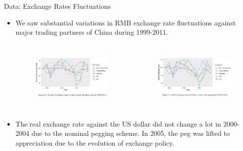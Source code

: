 \documentclass[10pt]{beamer}
\begin{document}
\begin{frame}{Data: Exchange Rates Fluctuations}
	\begin{itemize}
		\item We saw substantial variations in RMB exchange rate fluctuations against major trading partners of China during 1999-2011.
		\begin{columns}
			\begin{figure}[htbp]
				\centering
				\includegraphics[width=1.1\columnwidth]{Figure3.1.jpg}
				\label{fig3.1}
			\end{figure}
			\begin{figure}[htbp]
				\centering
				\includegraphics[width=1.1\columnwidth]{Figure3.2.jpg}
				\label{fig3.2}
			\end{figure}
		\end{columns}
		\item The real exchange rate against the US dollar did not change a lot in 2000-2004 due to the nominal pegging scheme. In 2005, the peg was lifted to appreciation due to the evolution of exchange policy.
	\end{itemize}
\end{frame}
\end{document}
